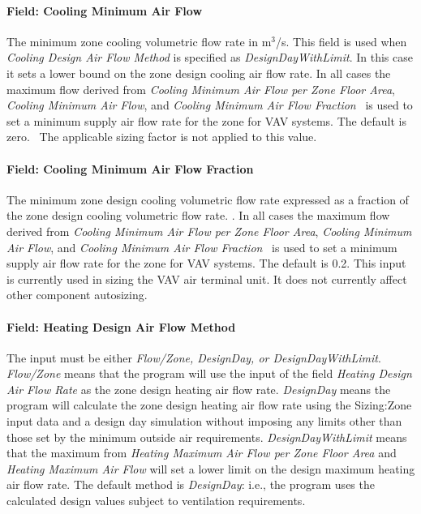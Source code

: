 \paragraph{Field: Cooling Minimum Air Flow}\label{field-cooling-minimum-air-flow}

The minimum zone cooling volumetric flow rate in m\(^{3}\)/s. This field is used when \emph{Cooling Design Air Flow Method} is specified as \emph{DesignDayWithLimit}. In this case it sets a lower bound on the zone design cooling air flow rate. In all cases the maximum flow derived from \emph{Cooling Minimum Air Flow per Zone Floor Area}, \emph{Cooling Minimum Air Flow}, and \emph{Cooling Minimum Air Flow Fraction}~ is used to set a minimum supply air flow rate for the zone for VAV systems. The default is zero.~ The applicable sizing factor is not applied to this value.

\paragraph{Field: Cooling Minimum Air Flow Fraction}\label{field-cooling-minimum-air-flow-fraction}

The minimum zone design cooling volumetric flow rate expressed as a fraction of the zone design cooling volumetric flow rate. . In all cases the maximum flow derived from \emph{Cooling Minimum Air Flow per Zone Floor Area}, \emph{Cooling Minimum Air Flow}, and \emph{Cooling Minimum Air Flow Fraction}~ is used to set a minimum supply air flow rate for the zone for VAV systems. The default is 0.2. This input is currently used in sizing the VAV air terminal unit. It does not currently affect other component autosizing.

\paragraph{Field: Heating Design Air Flow Method}\label{field-heating-design-air-flow-method}

The input must be either \emph{Flow/Zone, DesignDay, or DesignDayWithLimit}. \emph{Flow/Zone} means that the program will use the input of the field \emph{Heating Design Air Flow Rate} as the zone design heating air flow rate. \emph{DesignDay} means the program will calculate the zone design heating air flow rate using the Sizing:Zone input data and a design day simulation without imposing any limits other than those set by the minimum outside air requirements. \emph{DesignDayWithLimit} means that the maximum from \emph{Heating Maximum Air Flow per Zone Floor Area} and \emph{Heating Maximum Air Flow} will set a lower limit on the design maximum heating air flow rate. The default method is \emph{DesignDay}: i.e., the program uses the calculated design values subject to ventilation requirements.

